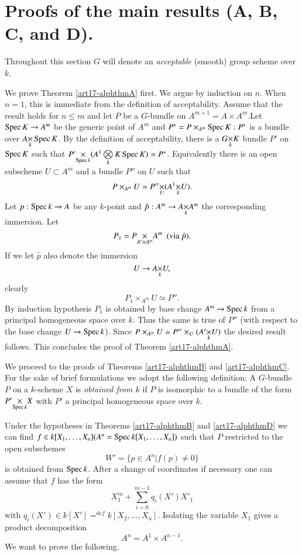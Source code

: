 \section{Proofs of the main results (A, B, C, and D).}\label{art17-sec3}
Throughout this section $G$ will denote an {\em acceptable} (smooth) group scheme over $k$.

We prove Theorem \ref{art17-alphthmA} first. We argue by induction on $n$. When $n=1$, this is immediate from the definition of acceptability. Assume that the result holds for $n \leqslant m$ and let $P$ be a $G$-bundle on $A^{m+1} = A \times A^m$.\pageoriginale Let $\operatorname{Spec} K \to A^m$ be the generic point of $A^m$ and $P^* = P\times_{A^m} \operatorname{Spec} K : P^*$ is a bundle over $\fprod{A}{\Spec}{k} K$. By the definition of acceptability, there is a $\fprod{G}{K}{k}$ bundle $P'$ on $\operatorname{Spec} K$ such that $\fprod{P'}{(A^1\bigotimes\limits_k K \Spec K)}{\Spec k} \simeq P^*$. Equivalently there is an open subscheme $U \subset A^m$ and a bundle $P''$ on $U$ such that 
$$
P \times_{A^m} U \simeq \fprod{P'' }{(\fprod{A^1}{U}{k})}{U}.
$$
Let $p: \operatorname{Spec} k \to A$ be any $k$-point and $\hat{p}:A^m \to \fprod{A}{A^m}{k}$ the corresponding immersion. Let 
$$
P_1 = \fprod{P}{A^m}{A' \times A^m} ~~ (\text{via } \hat{p}).
$$
If we let $\hat{p}$ also denote the immersion
$$
U \to \fprod{A}{U}{k},
$$
clearly
$$
P_1 \times_{A^m} U \simeq P''.
$$
By induction hypothesis $P_1$ is obtained by base change $A^m \to \operatorname{Spec} k$ from a principal homogeneous space over $k$. Thus the same is true of $P''$ (with respect to the base change $U \to \operatorname{Spec} k$). Since $P\times_{A^m} U \simeq P'' \times_U (\fprod{A'}{U}{k})$ the desired result follows. This concludes the proof of Theorem \ref{art17-alphthmA}.

We proceed to the proofs of Theorems \ref{art17-alphthmB} and \ref{art17-alphthmC}. For the sake of brief formulations we adopt the following definition: A $G$-bundle $P$ on a $k$-scheme $X$ is {\em obtained from $k$} if $P$ is isomorphic to a bundle of the form $\fprod{P'}{X}{\Spec k}$ with $P'$ a principal homogeneous space over $k$.

Under the hypotheses in Theorems \ref{art17-alphthmB} and \ref{art17-alphthmD} we can find $f \in k [X_1, \ldots,\\ X_n](A^n = \operatorname{Spec} k [X_1, \ldots, X_n])$ such that $P$ restricted to the open subschemes
$$
W' = \{ p \in A^n |f(p) \neq 0\}
$$
is obtained from $\operatorname{Spec} k$. After a change of coordinates if necessary one can assume that $f$ has the form 
$$
X^m_1 + \sum\limits^{m-1}_{i=0} q_i (X') X'_1
$$\pageoriginale
with $q_i (X') \in k [X'] {\displaystyle\mathop{=}^{def}} k [X_2, \ldots, X_n]$. Isolating the variable $X_1$ gives a product decomposition 
$$
A^n = A^1 \times A^{n-1}. 
$$
We want to prove the following.

